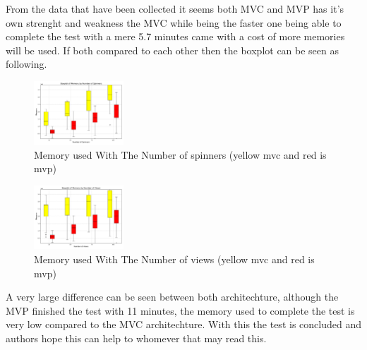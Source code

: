 \documentclass[conference]{IEEEtran}
\begin{document}
From the data that have been collected it seems both MVC and MVP has it's own strenght and weakness the MVC while being the faster one being able to complete the test with a mere 5.7 minutes came with a cost of more memories will be used. If both compared to each other then the boxplot can be seen as following.
\begin{figure}
    [h]
    \centering
    \includegraphics[width = 0.3\textwidth]{Image/mvc_vs_mvp_plot_spin_total_memory.pdf}
    \caption{Memory used With The Number of spinners (yellow mvc and red is mvp)}
    \label{fig:enter-label}
\end{figure}
\begin{figure}
    [h]
    \centering
    \includegraphics[width = 0.3\textwidth]{Image/mvc_vs_mvp_plot_view_total_memory.pdf}
    \caption{Memory used With The Number of views (yellow mvc and red is mvp)}
    \label{fig:enter-label}
\end{figure}
A very large difference can be seen between both architechture, although the MVP finished the test with 11 minutes, the memory used to complete the test is very low compared to the MVC architechture. With this the test is concluded and authors hope this can help to whomever that may read this.





\end{document}
